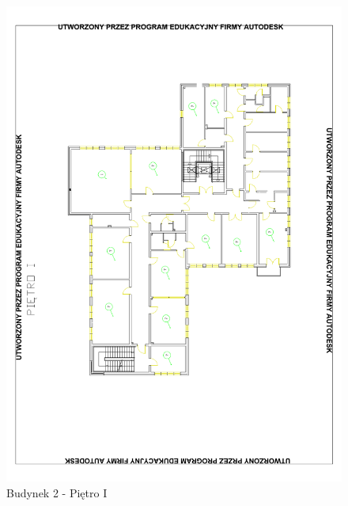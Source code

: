 \begin{figure}[H]
  \begin{center}
    \includegraphics[width=\textwidth]{img/b2-1.pdf}
    \caption{Budynek 2 - Piętro I}
  \end{center}
\end{figure}

